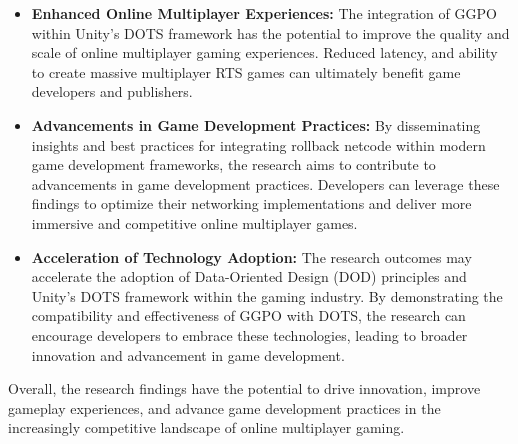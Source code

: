 \begin{itemize}
    \item \textbf{Enhanced Online Multiplayer Experiences:} The integration of GGPO within Unity's DOTS framework has the potential to improve the quality and scale of online multiplayer gaming experiences. Reduced latency, and ability to create massive multiplayer RTS games can ultimately benefit game developers and publishers.
    
    \item \textbf{Advancements in Game Development Practices:} By disseminating insights and best practices for integrating rollback netcode within modern game development frameworks, the research aims to contribute to advancements in game development practices. Developers can leverage these findings to optimize their networking implementations and deliver more immersive and competitive online multiplayer games.
    
    \item \textbf{Acceleration of Technology Adoption:} The research outcomes may accelerate the adoption of Data-Oriented Design (DOD) principles and Unity's DOTS framework within the gaming industry. By demonstrating the compatibility and effectiveness of GGPO with DOTS, the research can encourage developers to embrace these technologies, leading to broader innovation and advancement in game development.
\end{itemize}

Overall, the research findings have the potential to drive innovation, improve gameplay experiences, and advance game development practices in the increasingly competitive landscape of online multiplayer gaming.